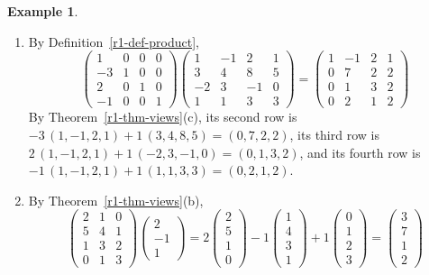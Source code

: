 \documentclass[12pt]{article}
\theoremstyle{definition}
\newtheorem{example}[theorem]{Example}
\begin{document}
\begin{example}\label{r1-exm-products}
\begin{enumerate}
\item By Definition~\ref{r1-def-product},
\[
\begin{pmatrix}1&0&0&0\\-3&1&0&0\\2&0&1&0\\-1&0&0&1\end{pmatrix}
\begin{pmatrix}1&-1&2&1\\3&4&8&5\\-2&3&-1&0\\1&1&3&3\end{pmatrix}
=\begin{pmatrix}1&-1&2&1\\0&7&2&2\\0&1&3&2\\0&2&1&2\end{pmatrix}
\]
By Theorem~\ref{r1-thm-views}(c), its second row is \(-3\,(1,-1,2,1)+1\,(3,4,8,5)=(0,7,2,2)\), its third row is
\(2\,(1,-1,2,1)+1\,(-2,3,-1,0)=(0,1,3,2)\), and its fourth row is \(-1\,(1,-1,2,1)+1\,(1,1,3,3)=(0,2,1,2)\).
\item By Theorem~\ref{r1-thm-views}(b),
\[
\begin{pmatrix}2&1&0\\5&4&1\\1&3&2\\0&1&3\end{pmatrix}\begin{pmatrix}2\\-1\\1\end{pmatrix}
=2\begin{pmatrix}2\\5\\1\\0\end{pmatrix}-1\begin{pmatrix}1\\4\\3\\1\end{pmatrix}+1\begin{pmatrix}0\\1\\2\\3\end{pmatrix}
=\begin{pmatrix}3\\7\\1\\2\end{pmatrix}
\]
\end{enumerate}
\end{example}
\end{document}
